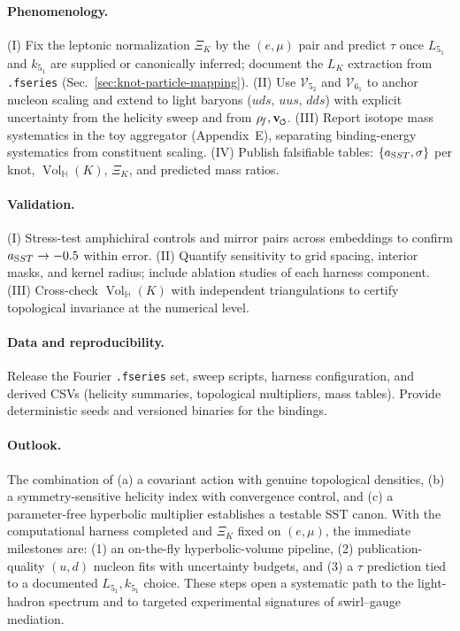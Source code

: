\documentclass[smallextended]{svjour3}       %
\newcommand{\swirlarrow}{%
	\mathchoice{\mkern-2mu\scriptstyle\boldsymbol{\circlearrowleft}}%
	{\mkern-2mu\scriptstyle\boldsymbol{\circlearrowleft}}%
	{\mkern-2mu\scriptscriptstyle\boldsymbol{\circlearrowleft}}%
	{\mkern-2mu\scriptscriptstyle\boldsymbol{\circlearrowleft}}%
}
\newcommand{\Vol}{\operatorname{Vol}}   %
\newcommand{\rhof}{\rhoF}               %
\newcommand{\vswirl}{\mathbf{v}_{\swirlarrow}}
\newcommand{\rhoF}{\rho_{\!f}}      %
\begin{document}
    \paragraph{Phenomenology.}
    (I) Fix the leptonic normalization \(\Xi_K\) by the \((e,\mu)\) pair and predict \(\tau\) once \(L_{5_1}\) and \(k_{5_1}\) are supplied or canonically inferred; document the \(L_K\) extraction from \texttt{.fseries} (Sec.~\ref{sec:knot-particle-mapping}).
    (II) Use \(\mathcal{V}_{5_2}\) and \(\mathcal{V}_{6_1}\) to anchor nucleon scaling and extend to light baryons (\(uds,\,uus,\,dds\)) with explicit uncertainty from the helicity sweep and from \(\rhof,\vswirl\).
    (III) Report isotope mass systematics in the toy aggregator (Appendix~E), separating binding-energy systematics from constituent scaling.
    (IV) Publish falsifiable tables: \(\{a_{\textrm SST},\sigma\}\) per knot, \(\Vol_{\!\mathbb{H}}(K)\), \(\Xi_K\), and predicted mass ratios.

    \paragraph{Validation.}
    (I) Stress-test amphichiral controls and mirror pairs across embeddings to confirm \(a_{\textrm SST}\rightarrow -0.5\) within error.
    (II) Quantify sensitivity to grid spacing, interior masks, and kernel radius; include ablation studies of each harness component.
    (III) Cross-check \(\Vol_{\!\mathbb{H}}(K)\) with independent triangulations to certify topological invariance at the numerical level.

    \paragraph{Data and reproducibility.}
    Release the Fourier \texttt{.fseries} set, sweep scripts, harness configuration, and derived CSVs (helicity summaries, topological multipliers, mass tables). Provide deterministic seeds and versioned binaries for the bindings.

    \paragraph{Outlook.}
    The combination of (a) a covariant action with genuine topological densities, (b) a symmetry-sensitive helicity index with convergence control, and (c) a parameter-free hyperbolic multiplier establishes a testable SST canon. With the computational harness completed and \(\Xi_K\) fixed on \((e,\mu)\), the immediate milestones are: (1) an on-the-fly hyperbolic-volume pipeline, (2) publication-quality \((u,d)\) nucleon fits with uncertainty budgets, and (3) a \(\tau\) prediction tied to a documented \(L_{5_1},k_{5_1}\) choice. These steps open a systematic path to the light-hadron spectrum and to targeted experimental signatures of swirl–gauge mediation.
\end{document}

